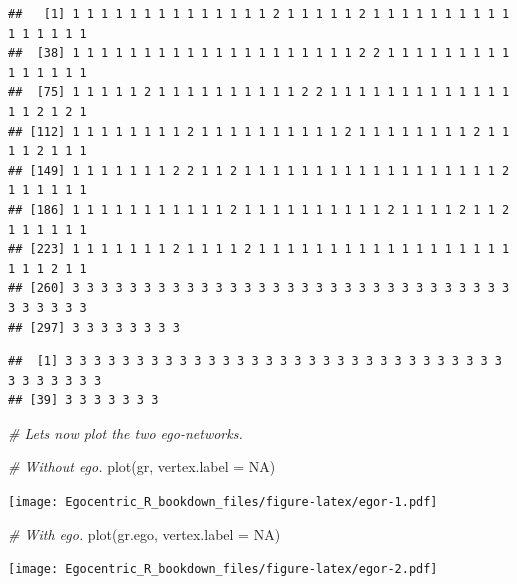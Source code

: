 \documentclass[
]{book}
\newenvironment{Shaded}{\begin{snugshade}}{\end{snugshade}}
\newcommand{\AttributeTok}[1]{\textcolor[rgb]{0.77,0.63,0.00}{#1}}
\newcommand{\CommentTok}[1]{\textcolor[rgb]{0.56,0.35,0.01}{\textit{#1}}}
\newcommand{\ConstantTok}[1]{\textcolor[rgb]{0.00,0.00,0.00}{#1}}
\newcommand{\FunctionTok}[1]{\textcolor[rgb]{0.00,0.00,0.00}{#1}}
\newcommand{\NormalTok}[1]{#1}
\newcommand{\SpecialCharTok}[1]{\textcolor[rgb]{0.00,0.00,0.00}{#1}}
\newcommand{\StringTok}[1]{\textcolor[rgb]{0.31,0.60,0.02}{#1}}
\begin{document}
\begin{verbatim}
##   [1] 1 1 1 1 1 1 1 1 1 1 1 1 1 1 2 1 1 1 1 1 2 1 1 1 1 1 1 1 1 1 1 1 1 1 1 1 1
##  [38] 1 1 1 1 1 1 1 1 1 1 1 1 1 1 1 1 1 1 1 1 2 2 1 1 1 1 1 1 1 1 1 1 1 1 1 1 1
##  [75] 1 1 1 1 1 2 1 1 1 1 1 1 1 1 1 1 2 2 1 1 1 1 1 1 1 1 1 1 1 1 1 1 1 2 1 2 1
## [112] 1 1 1 1 1 1 1 1 2 1 1 1 1 1 1 1 1 1 1 2 1 1 1 1 1 1 1 1 2 1 1 1 1 2 1 1 1
## [149] 1 1 1 1 1 1 1 2 2 1 1 2 1 1 1 1 1 1 1 1 1 1 1 1 1 1 1 1 1 1 2 1 1 1 1 1 1
## [186] 1 1 1 1 1 1 1 1 1 1 1 2 1 1 1 1 1 1 1 1 1 1 2 1 1 1 1 2 1 1 2 1 1 1 1 1 1
## [223] 1 1 1 1 1 1 1 2 1 1 1 1 2 1 1 1 1 1 1 1 1 1 1 1 1 1 1 1 1 1 1 1 1 1 2 1 1
## [260] 3 3 3 3 3 3 3 3 3 3 3 3 3 3 3 3 3 3 3 3 3 3 3 3 3 3 3 3 3 3 3 3 3 3 3 3 3
## [297] 3 3 3 3 3 3 3 3
\end{verbatim}

\begin{Shaded}
\end{Shaded}

\begin{verbatim}
##  [1] 3 3 3 3 3 3 3 3 3 3 3 3 3 3 3 3 3 3 3 3 3 3 3 3 3 3 3 3 3 3 3 3 3 3 3 3 3 3
## [39] 3 3 3 3 3 3 3
\end{verbatim}

\begin{Shaded}
\begin{Highlighting}[]
\CommentTok{\# Let\textquotesingle{}s now plot the two ego{-}networks.}

\CommentTok{\# Without ego.}
\FunctionTok{plot}\NormalTok{(gr, }\AttributeTok{vertex.label =} \ConstantTok{NA}\NormalTok{)}
\end{Highlighting}
\end{Shaded}

\texttt{[image: Egocentric\_R\_bookdown\_files/figure-latex/egor-1.pdf]}

\begin{Shaded}
\begin{Highlighting}[]
\CommentTok{\# With ego.}
\FunctionTok{plot}\NormalTok{(gr.ego, }\AttributeTok{vertex.label =} \ConstantTok{NA}\NormalTok{)}
\end{Highlighting}
\end{Shaded}

\texttt{[image: Egocentric\_R\_bookdown\_files/figure-latex/egor-2.pdf]}
\end{document}
